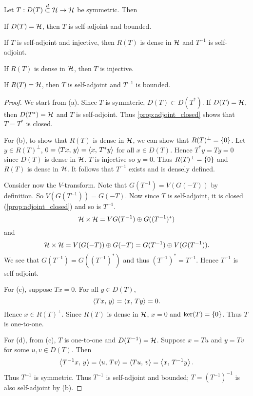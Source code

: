 \begin{theorem}
    Let $T:D(T)\overset{d}{\subset}\mathcal{H}\to\mathcal{H}$ be symmetric. Then 
    \begin{thmenum}
        \item If $D(T) = \mathcal{H}$, then $T$ is self-adjoint and bounded. 
        \item If $T$ is self-adjoint and injective, then $R(T)$ 
        is dense in $\mathcal{H}$ and $T^{-1}$ is self-adjoint. 
        \item If $R(T)$ is dense in $\mathcal{H}$, then $T$ is injective. 
        \item If $R(T) = \mathcal{H}$, then $T$ is self-adjoint and $T^{-1}$ 
        is bounded.
    \end{thmenum}
\end{theorem}
\begin{proof}
    We start from (a). Since $T$ is symmteric, $D(T)\subset D(T^*)$. 
    If $D(T) = \mathcal{H}$, then $D(T^*) = \mathcal{H}$ and $T$ is self-adjoint. 
    Thus \cref{prop:adjoint_closed} shows that $T = T^*$ is closed.

    For (b), to show that $R(T)$ is dense in $\mathcal{H}$, we can 
    show that $R(T)^\perp = \left\{ {0} \right\}$. Let $y\in R(T)^\perp$, 
    $0 = \left\langle {Tx},\, {y} \right\rangle = \left\langle {x},\, {T^*y} \right\rangle$ for all $x\in D(T)$. 
    Hence $T^*y = Ty = 0$ since $D(T)$ is dense in $\mathcal{H}$. $T$ 
    is injective so $y = 0$. Thus $R(T)^\perp = \left\{ {0} \right\}$ and 
    $R(T)$ is dense in $\mathcal{H}$. It follows that $T^{-1}$ exists 
    and is densely defined. 
    
    Consider now the $V$-transform. Note that $G(T^{-1}) 
    = V(G(-T))$ by definition. So $V(G(T^{-1})) = G(-T)$. 
    Now since $T$ is self-adjoint, it is closed 
    (\cref{prop:adjoint_closed}) and so is $T^{-1}$. 
    \begin{equation*}
        \mathcal{H}\times\mathcal{H} = VG(T^{-1})\oplus G((T^{-1})^*)
    \end{equation*}
    and 
    \begin{equation*}
        \mathcal{H}\times\mathcal{H} = V(G(-T))\oplus G(-T) = G(T^{-1})\oplus V(G(T^{-1})).
    \end{equation*}
    We see that $G(T^{-1}) = G((T^{-1})^*)$ and thus
    $(T^{-1})^* = T^{-1}$. Hence $T^{-1}$ is self-adjoint.

    For (c), suppose $Tx = 0$. For all $y\in D(T)$, 
    \begin{equation*}
        \left\langle {Tx},\, {y} \right\rangle = \left\langle {x},\, {Ty} \right\rangle = 0. 
    \end{equation*}
    Hence $x\in R(T)^\perp$. Since $R(T)$ is dense in $\mathcal{H}$, $x = 0$ and 
    $\ker(T) = \left\{ {0} \right\}$. Thus $T$ is one-to-one. 

    For (d), from (c), $T$ is one-to-one and $D(T^{-1}) = \mathcal{H}$. Suppose 
    $x = Tu$ and $y = Tv$ for some $u,v\in D(T)$. Then
    \begin{equation*}
        \left\langle {T^{-1}x},\, {y} \right\rangle = \left\langle {u},\, {Tv} \right\rangle = \left\langle {Tu},\, {v} \right\rangle = \left\langle {x},\, {T^{-1}y} \right\rangle.
    \end{equation*}
    Thus $T^{-1}$ is symmetric. Thus $T^{-1}$ is self-adjoint and bounded; 
    $T = (T^{-1})^{-1}$ is also self-adjoint by (b).  
\end{proof}

